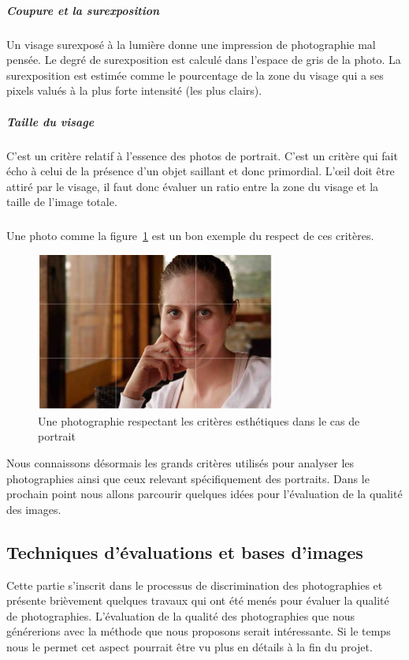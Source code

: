 \documentclass[11pt, french]{report-rd-info}
\begin{document}
\subparagraph{Coupure et la surexposition} Un visage surexposé à la lumière donne une impression de photographie mal pensée. Le degré de  surexposition est calculé dans l’espace de gris de la photo. La surexposition est estimée comme le pourcentage de la zone du visage qui a ses pixels valués à la plus forte intensité (les plus clairs).
\subparagraph{Taille du visage} C'est un critère relatif à l’essence des photos de portrait. C'est un critère qui fait écho à celui de la présence d'un objet saillant et donc primordial. L’œil doit être attiré par le visage, il faut donc évaluer un ratio entre la zone du visage et la taille de l’image totale.
\subparagraph*{}
Une photo comme la figure~\ref{fig:VisageAgreable} est un bon exemple du respect de ces critères.
\begin{figure}
	\centering
	\includegraphics[width=0.7\textwidth]{Images/ea_visageagreable}
	\caption{Une photographie respectant les critères esthétiques dans le cas de portrait \cite{Males2013}}
	\label{fig:VisageAgreable}
\end{figure}
Nous connaissons désormais les grands critères utilisés pour analyser les photographies ainsi que ceux relevant spécifiquement des portraits. Dans le prochain point nous allons parcourir quelques idées pour l'évaluation de la qualité des images.
\subsection{Techniques d’évaluations et bases d’images}
\label{part:PointEvaluation}
Cette partie s’inscrit dans le processus de discrimination des photographies et présente brièvement quelques travaux qui ont été menés pour évaluer la qualité de photographies. L’évaluation de la qualité des photographies que nous générerions avec la méthode que nous proposons serait intéressante. Si le temps nous le permet cet aspect pourrait être vu plus en détails à la fin du projet.
\end{document}
